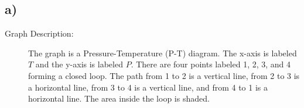 

\subsection*{a)}

\begin{description}
    \item[Graph Description:] The graph is a Pressure-Temperature (P-T) diagram. The x-axis is labeled \( T \) and the y-axis is labeled \( P \). There are four points labeled 1, 2, 3, and 4 forming a closed loop. The path from 1 to 2 is a vertical line, from 2 to 3 is a horizontal line, from 3 to 4 is a vertical line, and from 4 to 1 is a horizontal line. The area inside the loop is shaded.
\end{description}